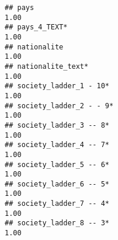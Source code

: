 \documentclass[
]{article}
\begin{document}
\begin{verbatim}
## pays                                                                                                                                                                                                                        1.00
## pays_4_TEXT*                                                                                                                                                                                                                1.00
## nationalite                                                                                                                                                                                                                 1.00
## nationalite_text*                                                                                                                                                                                                           1.00
## society_ladder_1 - 10*                                                                                                                                                                                                      1.00
## society_ladder_2 - - 9*                                                                                                                                                                                                     1.00
## society_ladder_3 -- 8*                                                                                                                                                                                                      1.00
## society_ladder_4 -- 7*                                                                                                                                                                                                      1.00
## society_ladder_5 -- 6*                                                                                                                                                                                                      1.00
## society_ladder_6 -- 5*                                                                                                                                                                                                      1.00
## society_ladder_7 -- 4*                                                                                                                                                                                                      1.00
## society_ladder_8 -- 3*                                                                                                                                                                                                      1.00

\end{verbatim}
\end{document}
